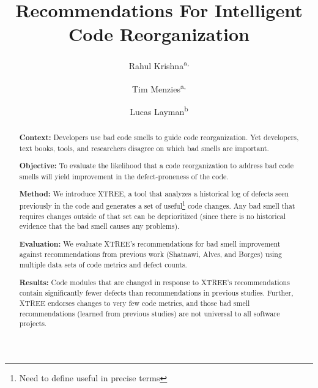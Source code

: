 \documentclass[twocolumn,5p]{elsarticle}
\theoremstyle{break}
\begin{document}
	
	\begin{frontmatter}
		
		\title{Recommendations For Intelligent Code Reorganization}
		
		\author{Rahul Krishna\textsuperscript{a,}}
		\author{Tim Menzies\textsuperscript{a,}}
		\author{Lucas Layman\textsuperscript{b}}
		\address{\textsuperscript{a}Department of Computer Science, North Carolina State University, Raleigh, NC, USA\\
			\textsuperscript{b}Fraunhofer CESE, College Park, USA}
		
		\begin{abstract} 
			{\bf Context: } 
			Developers use bad code smells to guide code reorganization.
			Yet developers, text books, tools, and researchers disagree on which bad smells are important.
			
			\noindent 
			{\bf Objective:} To evaluate the likelihood that a code reorganization to address bad code smells will yield improvement in the defect-proneness of the code.
			
			\noindent
			{\bf Method: } We introduce XTREE, a tool that analyzes a historical log of defects seen previously in the code and generates a set of useful\footnote{Need to define useful in precise terms} code changes.
			Any bad smell that requires changes outside of that set can be deprioritized (since there is no historical evidence that the bad smell causes any problems).
			
			\noindent
			{\bf Evaluation: } We evaluate XTREE's recommendations for bad smell improvement against recommendations from previous work (Shatnawi, Alves, and Borges) using multiple data sets of code metrics and defect counts.  
			
			\noindent
			{\bf Results: }Code modules that are changed in response to XTREE's recommendations contain significantly fewer defects than recommendations in previous studies. Further, XTREE endorses changes to very few code metrics, and those bad smell recommendations (learned from previous studies) are not universal to all  software projects.
			

\end{abstract}
\end{frontmatter}
\end{document}
